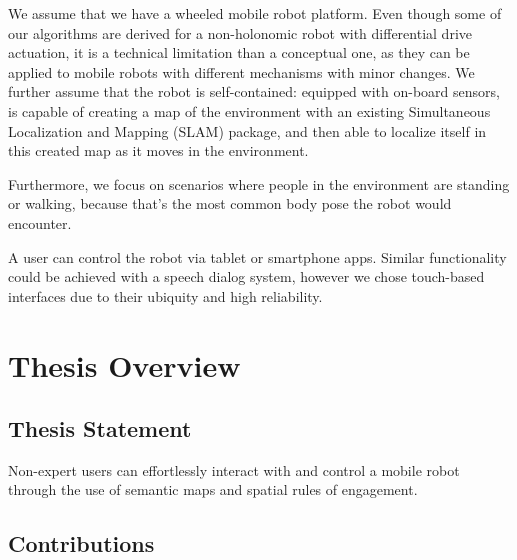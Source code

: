 We assume that we have a wheeled mobile robot platform. Even though some of our algorithms are derived for a non-holonomic robot with differential drive actuation, it is a technical limitation than a conceptual one, as they can be applied to mobile robots with different mechanisms with minor changes. We further assume that the robot is self-contained: equipped with on-board sensors, is capable of creating a map of the environment with an existing Simultaneous Localization and Mapping (SLAM) package, and then able to localize itself in this created map as it moves in the environment.

Furthermore, we focus on scenarios where people in the environment are standing or walking, because that's the most common body pose the robot would encounter. 

A user can control the robot via tablet or smartphone apps. Similar functionality could be achieved with a speech dialog system, however we chose touch-based interfaces due to their ubiquity and high reliability.

\section{Thesis Overview}
\subsection{Thesis Statement}


Non-expert users can effortlessly interact with and control a mobile robot through the use of semantic maps and spatial rules of engagement.

\subsection{Contributions}

